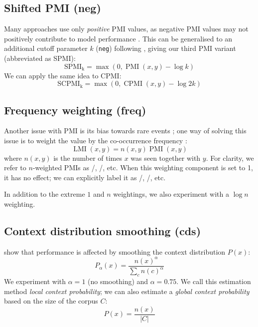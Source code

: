 \subsection{Shifted PMI (neg)}
\label{sec:shifted-pmi}

Many approaches use only \emph{positive} PMI values, as  negative PMI values may not positively contribute to model performance \cite{Turney:2010:FMV:1861751.1861756}. This can be generalised to an additional cutoff parameter $k$ (\texttt{neg}) following , giving our third PMI variant (abbreviated as SPMI):
%
\begin{equation}
  \label{eq:ppmi}
  \operatorname{SPMI_k} = \max (0, \operatorname{PMI}(x, y) - \log k)
\end{equation}
%
We can apply the same idea to CPMI:
%
\begin{equation}
  \label{eq:pcpmi}
  \operatorname{SCPMI_k} = \max (0, \operatorname{CPMI}(x, y) - \log 2k)
\end{equation}

\subsection{Frequency weighting (freq)}
\label{sec:frequency-weighting}

Another issue with PMI is its bias towards rare events \cite{TACL570}; one way of solving this issue is to weight the value by the co-occurrence frequency \cite{Evert05}:
%
\begin{equation}
  \label{eq:lmi}
  \operatorname{LMI}(x, y) = n(x, y)\operatorname{PMI}(x, y)
\end{equation}
%
where $n(x, y)$ is the number of times $x$ was seen together with $y$. For clarity, we refer to $n$-weighted PMIs as \NPMI/, \NSPMI/, etc. When this weighting component is set to 1, it has no effect; we can  explicitly label it as \PMI/, \SPMI/, etc.

In addition to the extreme $1$ and $n$ weightings, we also experiment with a $\log n$ weighting.

\subsection{Context distribution smoothing (cds)}
\label{sec:cont-distr-smooth}

 show that performance is affected by smoothing the context distribution $P(x)$:
%
\begin{equation}
  \label{eq:cds}
  P_{\alpha}(x) = \frac{n(x)^{\alpha}}{\sum_{c}n(c)^{\alpha}}
\end{equation}
%
We experiment with $\alpha=1$ (no smoothing) and $\alpha = 0.75$. We call this estimation method \emph{local context probability}; we can also estimate a \emph{global context probability} based on the size of the corpus $C$:
%
\begin{equation}
  \label{eq:cds-nan}
  P(x) = \frac{n(x)}{|C|}
\end{equation}

